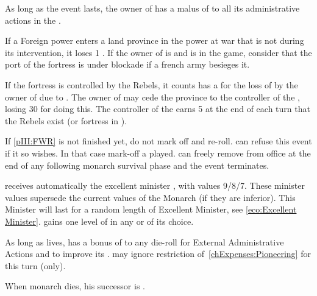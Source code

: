 \phadm
\aparag As long as the event lasts, the owner of \provincePoitou has a malus
of  to all its administrative actions in the \ROTW.

\phmil
\aparag If a Foreign power enters a land province in the power at war that is
not \provincePoitou during its intervention, it loses 1 \STAB.
\aparag If the owner of \provincePoitou is \FRA and  is in
the game, consider that the port of the fortress is under blockade if a french
army besieges it.

\phpaix
\aparag If the fortress is controlled by the Rebels, it counts has a \REVOLT
\facemoins for the loss of \STAB by the owner of \provincePoitou due to
\REVOLT .
\aparag The owner of \provincePoitou may cede the province to the controller
of the \REVOLT , losing 30 \PV for doing this.
\aparag The controller of the \REVOLT earns 5 \PV at the end of each turn that
the Rebels exist (\REVOLT or fortress in \provincePoitou).





\condition{}
\aparag If \ref{pIII:FWR} is not finished yet, do not mark off and re-roll.
\aparag \FRA can refuse this event if it so wishes. In that case mark-off a
played.
\aparag \FRA can freely remove  from office at the end of
any following monarch survival phase and the event terminates.

\phevnt
\aparag \FRA receives automatically the excellent minister
, with values 9/8/7.  These minister values supersede the
current values of the Monarch (if they are inferior). This Minister will last
for a random length of Excellent Minister, see \ref{eco:Excellent Minister}.
\aparag \FRA gains one level of \TradeFLEET in any \CTZ or \STZ of its choice.

\phadm
\aparag As long as  lives, \FRA has a bonus of 
to any die-roll for External Administrative Actions and to improve its \FTI.
\aparag \FRA may ignore restriction of~\ref{chExpenses:Pioneering} for this
turn (only).

\phinter
\aparag When \FRA monarch dies, his successor is .




